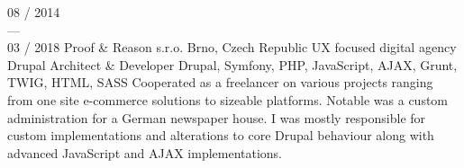 \documentclass[]{friggeri-cv} %
\begin{document}
\begin{entrylist}
  {08 / 2014 \\ --- \\ 03 / 2018}
  {Proof \& Reason s.r.o.}
  {Brno, Czech Republic}
  {UX focused digital agency}
  {
    \position
    {Drupal Architect \& Developer}
    {Drupal, Symfony, PHP, JavaScript, AJAX, Grunt, TWIG, HTML, SASS}
    {
      Cooperated as a freelancer on various projects ranging from one site e-commerce solutions to sizeable platforms.
      Notable was a custom administration for a German newspaper house.
      I was mostly responsible for custom implementations and alterations to core Drupal behaviour along with advanced JavaScript and AJAX implementations.
    }%
  }
\end{entrylist}
\end{document}
